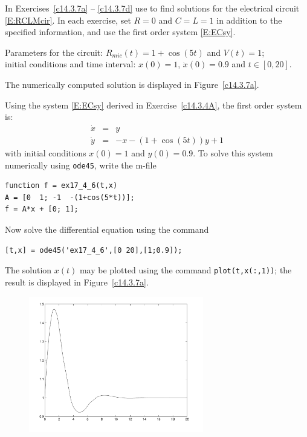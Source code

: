 \documentclass{ximera}
\begin{document}
\noindent In Exercises~\ref{c14.3.7a} -- \ref{c14.3.7d} use \Matlab
to find solutions for the electrical circuit 
\eqref{E:RCLMcir}.  In each exercise, set $R=0$ and $C=L=1$ in addition to 
the specified information, and use the first order system \eqref{E:ECsy}.

\begin{computerExercise} \label{c14.3.7a}
Parameters for the circuit: $R_{mic}(t) = 1+\cos(5t)$ and $V(t) = 1$;\\
initial conditions and time interval: $x(0) = 1$, $\dot{x}(0) = 0.9$ and  
$t\in[0,20]$.

\begin{solution}
\ans The numerically computed solution is displayed in 
Figure~\ref{c14.3.7a}.

\soln  Using the system \eqref{E:ECsy} derived in 
Exercise~\ref{c14.3.4A}, the first order system is:
\begin{eqnarray*}
\dot{x} & = & y \\
\dot{y} & = & -x - (1+\cos(5t))y + 1
\end{eqnarray*}
with initial conditions $x(0)=1$ and $y(0)=0.9$.   To solve this system numerically 
using {\tt ode45}, write the m-file
\begin{verbatim}
function f = ex17_4_6(t,x)
A = [0  1; -1  -(1+cos(5*t))];
f = A*x + [0; 1];
\end{verbatim}
Now solve the differential equation using the command
\begin{verbatim}
[t,x] = ode45('ex17_4_6',[0 20],[1;0.9]);
\end{verbatim}
The solution $x(t)$ may be plotted using the command {\tt plot(t,x(:,1))}; the 
result is displayed in Figure~\ref{c14.3.7a}.
\begin{figure}[htb]
     \centerline{%
     \includegraphics[width=3.0in]{exfigure/fig17-4-6.pdf}}
\end{figure} 


\end{solution}
\end{computerExercise}
\end{document}
